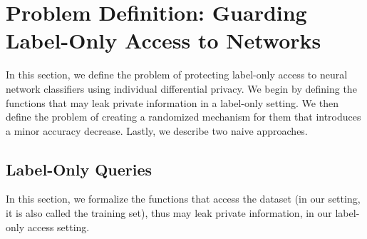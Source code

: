 \section{Problem Definition: Guarding Label-Only Access to Networks}
\label{sec:IDP} 
In this section, we define the problem of protecting label-only access to neural network classifiers using individual differential privacy. 
We begin by defining the functions that may leak private information in a label-only setting. We then define the problem of creating a randomized mechanism for them that introduces a minor accuracy decrease. Lastly, we describe two naive approaches. %


\subsection{Label-Only Queries} 

In this section, we formalize the functions that access the dataset (in our setting, it is also called the training set), thus may leak private information, in our label-only access setting. 

